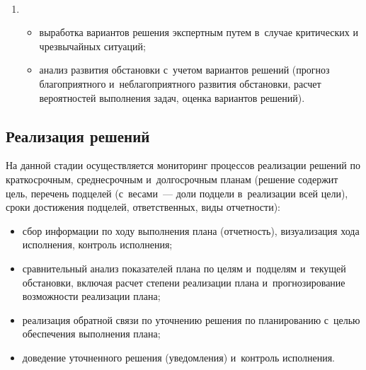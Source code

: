 \begin{figure*} %
\vspace*{1pt}
\begin{center}
\mbox{%
\epsfxsize=164.07mm
}
\end{center}
\vspace*{-11pt}
\vspace*{-3pt}
\end{figure*}

\begin{multicols}{2}

\noindent
\begin{enumerate}
\item[\ ]
\vspace*{-13pt}
\begin{itemize}
\item выработка вариантов решения экспертным путем в~случае критических 
и чрезвычайных ситуаций;\\[-15pt]
\item анализ развития обстановки с~учетом вариантов решений (прогноз 
благоприятного и~неблагоприятного развития обстановки, расчет 
вероятностей выполнения задач, оценка вариантов решений).
\end{itemize}
\end{enumerate}

\vspace*{-6pt}

    \subsection{Реализация решений }
    
    \vspace*{-2pt}
    
    На данной стадии осуществляется мониторинг процессов реализации 
решений по краткосрочным, среднесрочным и~долгосрочным планам 
(решение содержит цель, перечень подцелей (с~весами~--- доли подцели 
в~реализации всей цели), сроки достижения подцелей, ответственных, виды 
отчетности):
\begin{itemize}
\item сбор информации по ходу выполнения плана (отчетность), 
визуализация хода исполнения, контроль исполнения;\\[-15pt]
\item сравнительный анализ показателей плана по целям и~подцелям 
и~текущей обстановки, включая расчет степени реализации плана 
и~прогнозирование возможности реализации плана;\\[-15pt]
\item реализация обратной связи по уточнению решения по планированию 
с~целью обеспечения выполнения плана;\\[-15pt]
\item доведение уточненного решения (уведомления) и~контроль исполнения.
\end{itemize}


\end{multicols}
